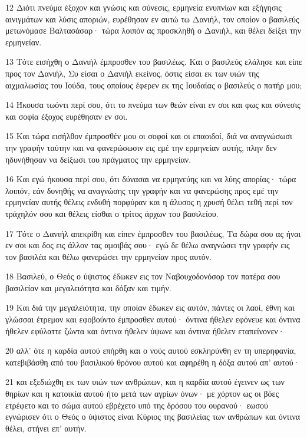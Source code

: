 \par 12 Διότι πνεύμα έξοχον και γνώσις και σύνεσις, ερμηνεία ενυπνίων και εξήγησις αινιγμάτων και λύσις αποριών, ευρέθησαν εν αυτώ τω Δανιήλ, τον οποίον ο βασιλεύς μετωνόμασε Βαλτασάσαρ· τώρα λοιπόν ας προσκληθή ο Δανιήλ, και θέλει δείξει την ερμηνείαν.
\par 13 Τότε εισήχθη ο Δανιήλ έμπροσθεν του βασιλέως. Και ο βασιλεύς ελάλησε και είπε προς τον Δανιήλ, Συ είσαι ο Δανιήλ εκείνος, όστις είσαι εκ των υιών της αιχμαλωσίας του Ιούδα, τους οποίους έφερεν εκ της Ιουδαίας ο βασιλεύς ο πατήρ μου;
\par 14 Ήκουσα τωόντι περί σου, ότι το πνεύμα των θεών είναι εν σοι και φως και σύνεσις και σοφία έξοχος ευρέθησαν εν σοι.
\par 15 Και τώρα εισήλθον έμπροσθέν μου οι σοφοί και οι επαοιδοί, διά να αναγνώσωσι την γραφήν ταύτην και να φανερώσωσιν εις εμέ την ερμηνείαν αυτής, πλην δεν ηδυνήθησαν να δείξωσι του πράγματος την ερμηνείαν.
\par 16 Και εγώ ήκουσα περί σου, ότι δύνασαι να ερμηνεύης και να λύης απορίας· τώρα λοιπόν, εάν δυνηθής να αναγνώσης την γραφήν και να φανερώσης προς εμέ την ερμηνείαν αυτής θέλεις ενδυθή πορφύραν και η άλυσος η χρυσή θέλει τεθή περί τον τράχηλόν σου και θέλεις είσθαι ο τρίτος άρχων του βασιλείου.
\par 17 Τότε ο Δανιήλ απεκρίθη και είπεν έμπροσθεν του βασιλέως, Τα δώρα σου ας ήναι εν σοι και δος εις άλλον τας αμοιβάς σου· εγώ δε θέλω αναγνώσει την γραφήν εις τον βασιλέα και θέλω φανερώσει την ερμηνείαν προς αυτόν.
\par 18 Βασιλεύ, ο Θεός ο ύψιστος έδωκεν εις τον Ναβουχοδονόσορ τον πατέρα σου βασιλείαν και μεγαλειότητα και δόξαν και τιμήν.
\par 19 Και διά την μεγαλειότητα, την οποίαν έδωκεν εις αυτόν, πάντες οι λαοί, έθνη και γλώσσαι έτρεμον και εφοβούντο έμπροσθεν αυτού· όντινα ήθελεν εφόνευε και όντινα ήθελεν εφύλαττε ζώντα και όντινα ήθελεν ύψωνε και όντινα ήθελεν εταπείνονεν·
\par 20 αλλ' ότε η καρδία αυτού επήρθη και ο νούς αυτού εσκληρύνθη εν τη υπερηφανία, κατεβιβάσθη από του βασιλικού θρόνου αυτού και αφηρέθη η δόξα αυτού απ' αυτού·
\par 21 και εξεδιώχθη εκ των υιών των ανθρώπων, και η καρδία αυτού έγεινεν ως των θηρίων και η κατοικία αυτού ήτο μετά των αγρίων όνων· με χόρτον ως οι βόες ετρέφετο και το σώμα αυτού εβρέχετο υπό της δρόσου του ουρανού· εωσού εγνώρισεν ότι ο Θεός ο ύψιστος είναι Κύριος της βασιλείας των ανθρώπων και όντινα θέλει, στήνει επ' αυτήν.
